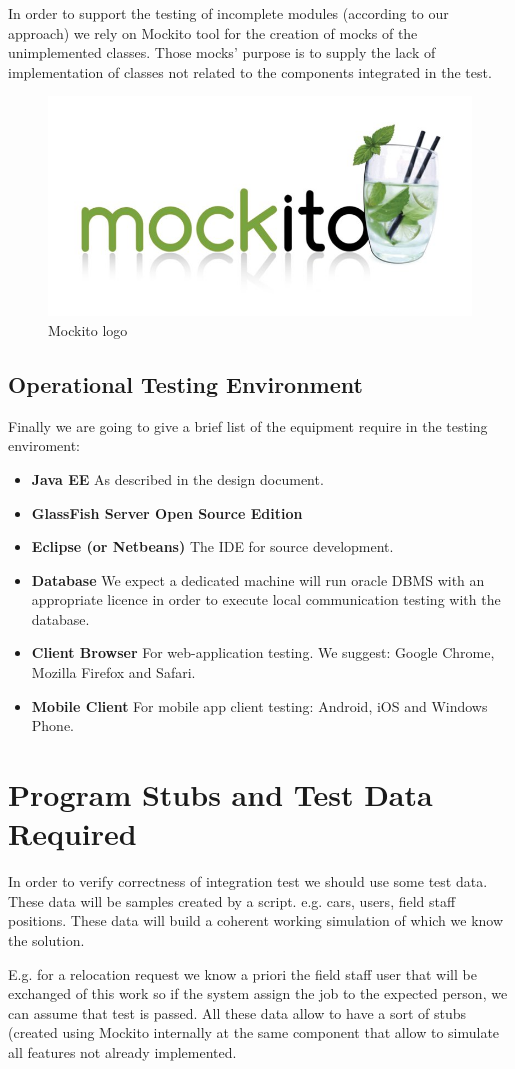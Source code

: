 \documentclass[english]{article}
\begin{document}
			In order to support the testing of incomplete modules (according to our approach) we rely on Mockito tool for the creation of mocks of the unimplemented classes. Those mocks' purpose is to supply the lack of implementation of classes not related to the components integrated in the test.
			\begin{figure}[H]
				\centering
				\includegraphics[scale=0.4]{./Images/mockito.jpg}%
				\caption{Mockito logo}
			\end{figure}
	\subsection{Operational Testing Environment}
		Finally we are going to give a brief list of the equipment require in the testing enviroment:
		\begin{itemize}
			\item \textbf{Java EE} As described in the design document.
			\item \textbf{GlassFish Server Open Source Edition}
			\item \textbf{Eclipse (or Netbeans)} The IDE for source development.
			\item \textbf{Database} We expect a dedicated machine will run oracle DBMS with an appropriate licence in order to execute local communication testing with the database. 
			\item \textbf{Client Browser} For web-application testing. We suggest: Google Chrome, Mozilla Firefox and Safari. 
			\item \textbf{Mobile Client} For mobile app client testing: Android, iOS and Windows Phone.
		\end{itemize}
\section{Program Stubs and Test Data Required}
		In order to verify correctness of integration test we should use some test data. These data will be samples created by a script. e.g. cars, users, field staff positions.
These data will build a coherent working simulation of which we know the solution. 
\par E.g. for a relocation request we know a priori the field staff user that will be exchanged of this work so if the system assign the job to the expected person, we can assume that test is passed. All these data allow to have a sort of stubs (created using Mockito internally at the same component that allow to simulate all features not already implemented.
\end{document}
